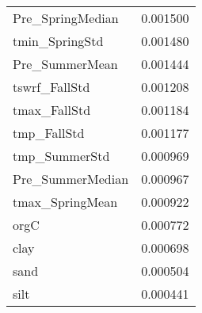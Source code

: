 \begin{tabular}{lr}
Pre_SpringMedian & 0.001500 \\
tmin_SpringStd & 0.001480 \\
Pre_SummerMean & 0.001444 \\
tswrf_FallStd & 0.001208 \\
tmax_FallStd & 0.001184 \\
tmp_FallStd & 0.001177 \\
tmp_SummerStd & 0.000969 \\
Pre_SummerMedian & 0.000967 \\
tmax_SpringMean & 0.000922 \\
orgC & 0.000772 \\
clay & 0.000698 \\
sand & 0.000504 \\
silt & 0.000441 \\
\bottomrule
\end{tabular}

